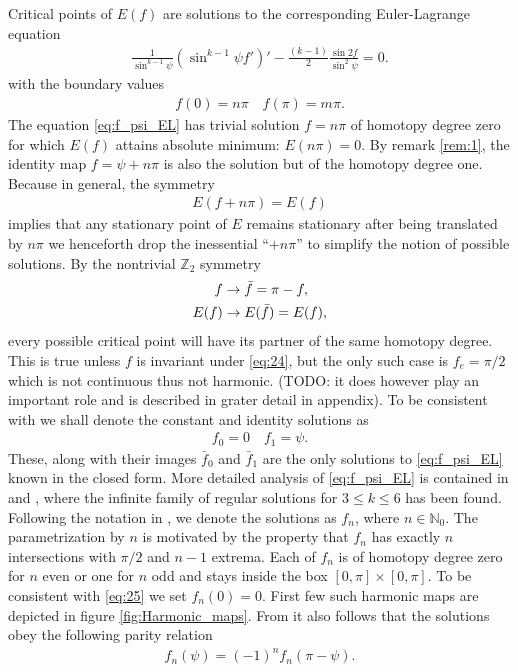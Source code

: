 Critical points of $E(f)$ are solutions to the corresponding
Euler-Lagrange equation
\begin{align}
  \label{eq:f_psi_EL} \frac{1}{\sin^{k-1}\psi}\left(\sin^{k-1}\psi
    f'\right)'-\frac{(k-1)}{2}\frac{\sin2f}{\sin^2\psi}=0.
\end{align} with the boundary values
\begin{align}
  \label{eq:22} f(0)=n\pi\quad f(\pi)=m\pi.
\end{align} The equation \eqref{eq:f_psi_EL} has trivial solution
$f=n\pi$ of homotopy degree zero for which $E(f)$ attains absolute
minimum: $E(n\pi)=0$. By remark \ref{rem:1}, the identity map
$f=\psi+n\pi$ is also the solution but of the homotopy degree one.
Because in general, the symmetry
\begin{align}
  \label{eq:23} E(f+n\pi)=E(f)
\end{align} implies that any stationary point of $E$ remains
stationary after being translated by $n\pi$ we henceforth drop the
inessential ``$+n\pi$'' to simplify the notion of possible
solutions. By the nontrivial $\mathbb{Z}_2$ symmetry
\begin{align}
  \label{eq:24}
  f&\rightarrow \bar{f}=\pi-f,\\
  E(f)&\rightarrow E(\bar{f})=E(f),
\end{align}
every possible critical point will have its partner of the same
homotopy degree. This is true unless $f$ is invariant under
\eqref{eq:24}, but the only such case is $f_e=\pi/2$ which is not
continuous thus not harmonic. (TODO: it does however play an important
role and is described in grater detail in appendix). To be consistent
with \cite{Bizon1997} we shall denote the constant and identity
solutions as
\begin{align}
  \label{eq:25}
  f_0=0\quad f_1=\psi.
\end{align}
These, along with their images $\bar{f}_0$ and $\bar{f}_1$ are the
only solutions to \eqref{eq:f_psi_EL} known in the closed form. More
detailed analysis of \eqref{eq:f_psi_EL} is contained in
\cite{Bizon1997} and \cite{Corlette2001}, where the infinite family of
regular solutions for $3\le k\le6$ has been found. Following the
notation in \cite{Bizon1997}, we denote the solutions as $f_n$, where
$n\in\mathbb{N}_0$. The parametrization by $n$ is motivated by the
property that $f_n$ has exactly $n$ intersections with $\pi/2$ and
$n-1$ extrema. Each of $f_n$ is of homotopy degree zero for $n$ even
or one for $n$ odd and stays inside the box $[0,\pi]\times[0,\pi]$.
To be consistent with \eqref{eq:25} we set $f_n(0)=0$. First few such
harmonic maps are depicted in figure \ref{fig:Harmonic_maps}. From
\cite{Bizon1997} it also follows that the solutions obey the following
parity relation
\begin{align}
  \label{eq:34}
  f_n(\psi)=(-1)^n f_n(\pi-\psi).
\end{align}

